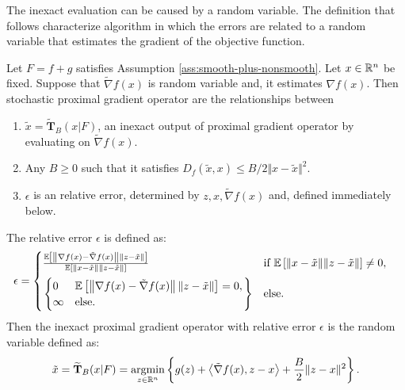 \documentclass[12pt]{article}
\newcommand{\expect}{\ensuremath{\mathbb E}}
\begin{document}
    The inexact evaluation can be caused by a random variable. 
    The definition that follows characterize algorithm in which the errors are related to a random variable that estimates the gradient of the objective function. 
    \begin{definition}\label{def:stoch-pg-opt-rel-err}
        Let $F = f + g$ satisfies Assumption \ref{ass:smooth-plus-nonsmooth}. 
        Let $x \in \mathbb R^n$ be fixed. 
        Suppose that $\tilde \nabla f(x)$ is random variable and, it estimates $\nabla f(x)$. 
        Then stochastic proximal gradient operator are the relationships between
        \begin{enumerate}[nosep]
            \item $\tilde x= \mathbf{\widetilde T}_B(x| F)$, an inexact output of proximal gradient operator by evaluating on $\tilde \nabla f(x)$. 
            \item Any $B \ge 0$ such that it satisfies $D_f(\tilde x, x) \le B/2\Vert x - \tilde x\Vert^2$. 
            \item $\epsilon$ is an relative error, determined by $z, x, \tilde\nabla f(x)$ and, defined immediately below. 
        \end{enumerate}
        The relative error $\epsilon$ is defined as: 
        \begin{align*}
            \epsilon 
            &= 
            \begin{cases}
                \frac{
                \expect \left[
                    \left\Vert \nabla f(x) - \tilde \nabla f(x) \right\Vert \Vert z - \tilde x\Vert
                \right]
                }{\expect \left[
                    \Vert x - \tilde x\Vert\Vert z - \tilde x\Vert
                \right]} 
                & \text{if } \expect\left[\Vert x - \tilde x\Vert\Vert z - \tilde x\Vert\right] \neq 0, 
                \vspace{0.5em}
                \\
                \left.\begin{cases}
                    0 & \expect \left[\left\Vert \nabla f(x) - \tilde \nabla f(x) \right\Vert \Vert z - \tilde x\Vert\right] = 0, 
                    \\
                    \infty & \text{else. } 
                \end{cases}\right\rbrace
                & \text{else. }
            \end{cases}
        \end{align*}
        Then the inexact proximal gradient operator with relative error $\epsilon$ is the random variable defined as: 
        \begin{align*}
            \tilde x = \mathbf{\widetilde T}_B(x| F) = \mathop{\rm argmin}\limits_{z \in \mathbb R^n}\left\lbrace
                g(z) + \left\langle \tilde \nabla f(x), z - x\right\rangle
                + \frac{B}{2}\Vert z - x\Vert^2
            \right\rbrace. 
        \end{align*}
    \end{definition}
\end{document}
